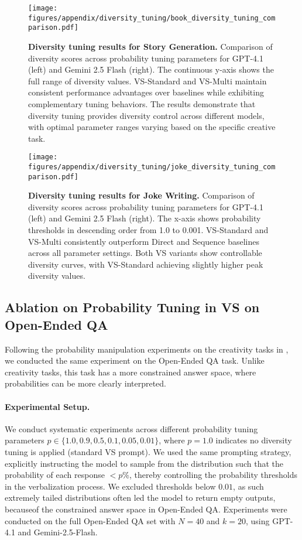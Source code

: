 \begin{figure}
    \centering
    \texttt{[image: figures/appendix/diversity\_tuning/book\_diversity\_tuning\_comparison.pdf]}
    \caption{
    \textbf{Diversity tuning results for Story Generation.}
    Comparison of diversity scores across probability
  tuning parameters for GPT-4.1 (left) and Gemini 2.5 Flash
  (right). The continuous y-axis shows the full range of
  diversity values. VS-Standard and VS-Multi maintain consistent
  performance advantages over baselines while exhibiting
  complementary tuning behaviors. The results demonstrate that
  diversity tuning provides diversity control
  across different models, with optimal parameter
  ranges varying based on the specific creative task.
    }
    \label{fig:diversity_tuning_story}
\end{figure}

\begin{figure}[h]
    \centering
    \texttt{[image: figures/appendix/diversity\_tuning/joke\_diversity\_tuning\_comparison.pdf]}
    \caption{
    \textbf{Diversity tuning results for Joke Writing.}
    Comparison of diversity scores across probability
  tuning parameters for GPT-4.1 (left) and Gemini 2.5 Flash
  (right). The x-axis shows probability thresholds in descending
  order from 1.0 to 0.001. VS-Standard and VS-Multi consistently
  outperform Direct and Sequence baselines across all parameter
  settings. Both VS
  variants show controllable diversity curves,
  with VS-Standard achieving slightly higher peak diversity values.
    }
    \label{fig:diversity_tuning_joke}
\end{figure}

\newpage
\subsection{Ablation on Probability Tuning in VS on Open-Ended QA} \label{sec:diversity_tuning_open_ended_qa}
Following the probability manipulation experiments on the creativity tasks in , we conducted the same experiment on the Open-Ended QA task. Unlike creativity tasks, this task has a more constrained answer space, where probabilities can be more clearly interpreted. 

\paragraph{Experimental Setup.} We conduct systematic experiments across different probability tuning parameters $p \in \{1.0, 0.9, 0.5, 0.1, 0.05, 0.01\}$, where $p = 1.0$ indicates no diversity tuning is applied (standard VS prompt). 
We used the same prompting strategy, explicitly instructing the model to sample from the distribution such that the probability of each response $< p\%$, thereby controlling the probability thresholds in the verbalization process. 
We excluded thresholds below $0.01$, as such extremely tailed distributions often led the model to return empty outputs, becauseof the constrained answer space in Open-Ended QA.
Experiments were conducted on the full Open-Ended QA set with $N=40$ and $k=20$, using GPT-4.1 and Gemini-2.5-Flash.

